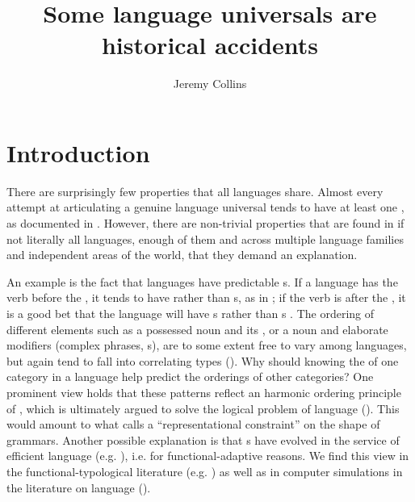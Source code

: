 \documentclass[output=paper]{langsci/langscibook}
\author{Jeremy Collins\affiliation{Radboud University Nijmegen}}
\title{Some language universals are historical accidents}
\begin{document}
\maketitle 
 
\section{Introduction}
\label{p:collins:historicalaccidents} 
\label{p:collins:dependency}
 
 
There are surprisingly few properties that all languages share. Almost every attempt at articulating a genuine language universal tends to have at least one , as documented in \citet{EvansLevinson2009}. However, there are non-trivial properties that are found in if not literally all languages, enough of them and across multiple language families and independent areas of the world, that they demand an explanation.  
 

An example is the fact that languages have predictable s. If a language has the verb before the , it tends to have  rather than s, as in ; if the verb is after the , it is a good bet that the language will have s rather than s \citep{Greenberg1963}. The ordering of different elements such as a possessed noun and its , or a noun and elaborate modifiers (complex  phrases, s), are to some extent free to vary among languages, but again tend to fall into correlating types (\citealt{Dryer1992,Dryer2011}). Why should knowing the  of one category in a language help predict the orderings of other categories? One prominent view holds that these patterns reflect an  harmonic ordering principle of , which is ultimately argued to solve the logical problem of language  (\citealt{Pinker1994,Baker2001,Roberts2007}). This would amount to what  calls a “representational constraint” on the shape of grammars. Another possible explanation is that s have evolved in the service of efficient language  (e.g. \citealt{Hawkins1994,KirbyHurford1997}), i.e. for functional-adaptive reasons. We find this view in the functional-typological literature (e.g. \citealt{Dryer1992,EvansLevinson2009}) as well as in computer simulations in the literature on language  (\citealt{VanEverbroeck1999}). 
\end{document}
